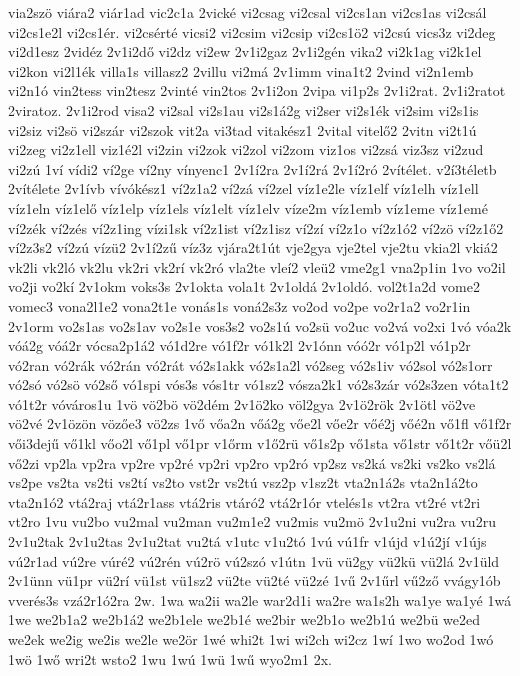 {via2szö
viára2
viár1ad
vic2c1a
2vické
vi2csag
vi2csal
vi2cs1an
vi2cs1as
vi2csál
vi2cs1e2l
vi2cs1ér.
vi2csérté
vicsi2
vi2csim
vi2csip
vi2cs1ö2
vi2csú
vics3z
vi2deg
vi2d1esz
2vidéz
2v1i2dő
vi2dz
vi2ew
2v1i2gaz
2v1i2gén
vika2
vi2k1ag
vi2k1el
vi2kon
vi2l1ék
villa1s
villasz2
2villu
vi2má
2v1imm
vina1t2
2vind
vi2n1emb
vi2n1ó
vin2tess
vin2tesz
2vinté
vin2tos
2v1i2on
2vipa
vi1p2s
2v1i2rat.
2v1i2ratot
2viratoz.
2v1i2rod
visa2
vi2sal
vi2s1au
vi2s1á2g
vi2ser
vi2s1ék
vi2sim
vi2s1is
vi2siz
vi2sö
vi2szár
vi2szok
vit2a
vi3tad
vitakész1
2vital
vitelő2
2vitn
vi2t1ú
vi2zeg
vi2z1ell
viz1é2l
vi2zin
vi2zok
vi2zol
vi2zom
viz1os
vi2zsá
viz3sz
vi2zud
vi2zú
1ví
vídi2
ví2ge
ví2ny
vínyenc1
2v1í2ra
2v1í2rá
2v1í2ró
2vítélet.
v2í3téletb
2vítélete
2v1ívb
vívókész1
ví2z1a2
ví2zá
ví2zel
víz1e2le
víz1elf
víz1elh
víz1ell
víz1eln
víz1elő
víz1elp
víz1els
víz1elt
víz1elv
víze2m
víz1emb
víz1eme
víz1emé
ví2zék
ví2zés
ví2z1ing
vízi1sk
ví2z1ist
ví2z1isz
ví2zí
ví2z1o
ví2z1ó2
ví2zö
ví2z1ő2
ví2z3s2
ví2zú
vízü2
2v1í2zű
víz3z
vjára2t1út
vje2gya
vje2tel
vje2tu
vkia2l
vkiá2
vk2li
vk2ló
vk2lu
vk2ri
vk2rí
vk2ró
vla2te
vleí2
vleü2
vme2g1
vna2p1in
1vo
vo2il
vo2ji
vo2kí
2v1okm
voks3s
2v1okta
vola1t
2v1oldá
2v1oldó.
vol2t1a2d
vome2
vomec3
vona2l1e2
vona2t1e
vonás1s
voná2s3z
vo2od
vo2pe
vo2r1a2
vo2r1in
2v1orm
vo2s1as
vo2s1av
vo2s1e
vos3s2
vo2s1ú
vo2sü
vo2uc
vo2vá
vo2xi
1vó
vóa2k
vóá2g
vóá2r
vócsa2p1á2
vó1d2re
vó1f2r
vó1k2l
2v1ónn
vóó2r
vó1p2l
vó1p2r
vó2ran
vó2rák
vó2rán
vó2rát
vó2s1akk
vó2s1a2l
vó2seg
vó2s1iv
vó2sol
vó2s1orr
vó2só
vó2sö
vó2ső
vó1spi
vós3s
vós1tr
vó1sz2
vósza2k1
vó2s3zár
vó2s3zen
vóta1t2
vó1t2r
vóváros1u
1vö
vö2bö
vö2dém
2v1ö2ko
völ2gya
2v1ö2rök
2v1ötl
vö2ve
vö2vé
2v1özön
vözőe3
vö2zs
1vő
vőa2n
vőá2g
vőe2l
vőe2r
vőé2j
vőé2n
vő1fl
vő1f2r
vői3dejű
vő1kl
vőo2l
vő1pl
vő1pr
v1őrm
v1ő2rü
vő1s2p
vő1sta
vő1str
vő1t2r
vőü2l
vő2zi
vp2la
vp2ra
vp2re
vp2ré
vp2ri
vp2ro
vp2ró
vp2sz
vs2ká
vs2ki
vs2ko
vs2lá
vs2pe
vs2ta
vs2ti
vs2tí
vs2to
vst2r
vs2tú
vsz2p
v1sz2t
vta2n1á2s
vta2n1á2to
vta2n1ó2
vtá2raj
vtá2r1ass
vtá2ris
vtáró2
vtá2r1ór
vtelés1s
vt2ra
vt2ré
vt2ri
vt2ro
1vu
vu2bo
vu2mal
vu2man
vu2m1e2
vu2mis
vu2mö
2v1u2ni
vu2ra
vu2ru
2v1u2tak
2v1u2tas
2v1u2tat
vu2tá
v1utc
v1u2tó
1vú
vú1fr
v1újd
v1ú2jí
v1újs
vú2r1ad
vú2re
vúré2
vú2rén
vú2rö
vú2szó
v1útn
1vü
vü2gy
vü2kü
vü2lá
2v1üld
2v1ünn
vü1pr
vü2rí
vü1st
vü1sz2
vü2te
vü2té
vü2zé
1vű
2v1űrl
vű2ző
vvágy1ób
vverés3s
vzá2r1ó2ra
2w.
1wa
wa2ii
wa2le
war2d1i
wa2re
wa1s2h
wa1ye
wa1yé
1wá
1we
we2b1a2
we2b1á2
we2b1ele
we2b1é
we2bir
we2b1o
we2b1ú
we2bü
we2ed
we2ek
we2ig
we2is
we2le
we2ör
1wé
whi2t
1wi
wi2ch
wi2cz
1wí
1wo
wo2od
1wó
1wö
1wő
wri2t
wsto2
1wu
1wú
1wü
1wű
wyo2m1
2x.
}
